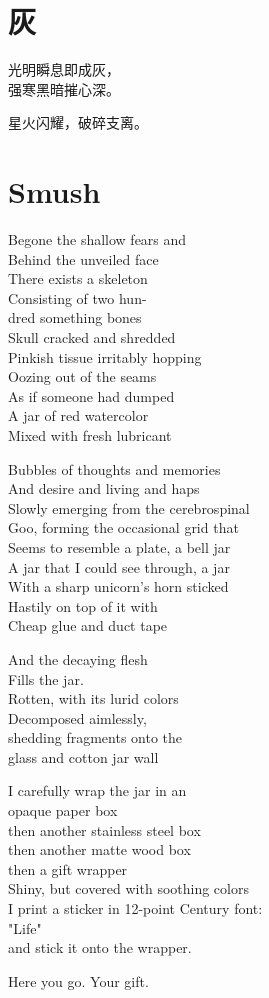 \documentclass[parskip=full,12pt,oneside,a5paper]{scrbook}
\begin{document}
\endgroup

\chapter{灰}
\begingroup\addtolength{\baselineskip}{0.75ex}

光明瞬息即成灰，\\
强寒黑暗摧心深。

星火闪耀，破碎支离。

\endgroup

\chapter{Smush}

Begone the shallow fears and\\
Behind the unveiled face\\
There exists a skeleton\\
Consisting of two hun-\\
dred something bones\\
Skull cracked and shredded\\
Pinkish tissue irritably hopping\\
Oozing out of the seams\\
As if someone had dumped\\
A jar of red watercolor\\
Mixed with fresh lubricant

Bubbles of thoughts and memories\\
And desire and living and haps\\
Slowly emerging from the cerebrospinal\\
Goo, forming the occasional grid that\\
Seems to resemble a plate, a bell jar\\
A jar that I could see through, a jar\\
With a sharp unicorn's horn sticked\\
Hastily on top of it with\\
Cheap glue and duct tape

And the decaying flesh\\
Fills the jar.\\
Rotten, with its lurid colors\\
Decomposed aimlessly,\\
shedding fragments onto the\\
glass and cotton jar wall

I carefully wrap the jar in an\\
opaque paper box\\
then another stainless steel box\\
then another matte wood box\\
then a gift wrapper\\
Shiny, but covered with soothing colors\\
I print a sticker in 12-point Century font:\\
\qquad "Life"\\
and stick it onto the wrapper.

Here you go. Your gift.
\end{document}
